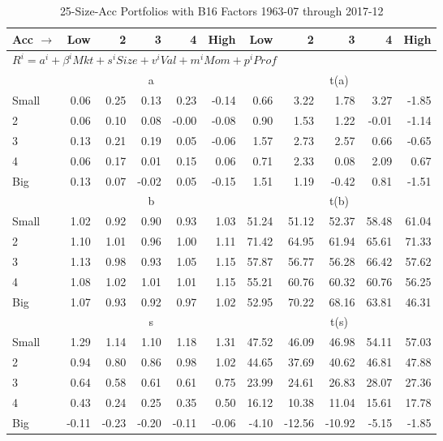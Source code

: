 
\begin{table}[!ht]
\footnotesize
\centering
\caption{25-Size-Acc Portfolios with B16 Factors 1963-07 through 2017-12}
\begin{tabular}{lrrrrrrrrrr}
  \toprule
    
    Acc $\rightarrow$ & Low & 2 & 3 & 4 & High & Low & 2 & 3 & 4 & High  \\ 
  \midrule
  \multicolumn{11}{l}{$R^i=a^i+\beta^iMkt+s^iSize+v^iVal+m^iMom+p^iProf$}  \\
  
     & \multicolumn{5}{c}{a} & \multicolumn{5}{c}{t(a)}   \\
     \cmidrule(r){2-6} \cmidrule(r){7-11} 
    Small  & 0.06  & 0.25  & 0.13  & 0.23  & -0.14  & 0.66  & 3.22  & 1.78  & 3.27  & -1.85   \\
    2  & 0.06  & 0.10  & 0.08  & -0.00  & -0.08  & 0.90  & 1.53  & 1.22  & -0.01  & -1.14   \\
    3  & 0.13  & 0.21  & 0.19  & 0.05  & -0.06  & 1.57  & 2.73  & 2.57  & 0.66  & -0.65   \\
    4  & 0.06  & 0.17  & 0.01  & 0.15  & 0.06  & 0.71  & 2.33  & 0.08  & 2.09  & 0.67   \\
    Big  & 0.13  & 0.07  & -0.02  & 0.05  & -0.15  & 1.51  & 1.19  & -0.42  & 0.81  & -1.51   \\
    
  
     & \multicolumn{5}{c}{b} & \multicolumn{5}{c}{t(b)}   \\
     \cmidrule(r){2-6} \cmidrule(r){7-11} 
    Small  & 1.02  & 0.92  & 0.90  & 0.93  & 1.03  & 51.24  & 51.12  & 52.37  & 58.48  & 61.04   \\
    2  & 1.10  & 1.01  & 0.96  & 1.00  & 1.11  & 71.42  & 64.95  & 61.94  & 65.61  & 71.33   \\
    3  & 1.13  & 0.98  & 0.93  & 1.05  & 1.15  & 57.87  & 56.77  & 56.28  & 66.42  & 57.62   \\
    4  & 1.08  & 1.02  & 1.01  & 1.01  & 1.15  & 55.21  & 60.76  & 60.32  & 60.76  & 56.25   \\
    Big  & 1.07  & 0.93  & 0.92  & 0.97  & 1.02  & 52.95  & 70.22  & 68.16  & 63.81  & 46.31   \\
    
  
     & \multicolumn{5}{c}{s} & \multicolumn{5}{c}{t(s)}   \\
     \cmidrule(r){2-6} \cmidrule(r){7-11} 
    Small  & 1.29  & 1.14  & 1.10  & 1.18  & 1.31  & 47.52  & 46.09  & 46.98  & 54.11  & 57.03   \\
    2  & 0.94  & 0.80  & 0.86  & 0.98  & 1.02  & 44.65  & 37.69  & 40.62  & 46.81  & 47.88   \\
    3  & 0.64  & 0.58  & 0.61  & 0.61  & 0.75  & 23.99  & 24.61  & 26.83  & 28.07  & 27.36   \\
    4  & 0.43  & 0.24  & 0.25  & 0.35  & 0.50  & 16.12  & 10.38  & 11.04  & 15.61  & 17.78   \\
    Big  & -0.11  & -0.23  & -0.20  & -0.11  & -0.06  & -4.10  & -12.56  & -10.92  & -5.15  & -1.85   \\
    

\end{tabular}
\end{table}
